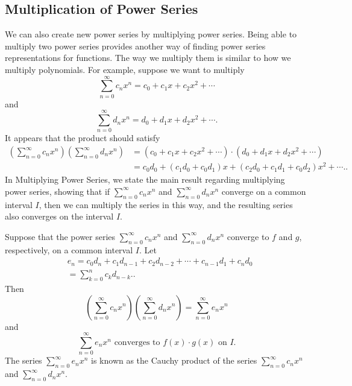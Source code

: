 \documentclass{report}
\begin{document}
    \subsection*{Multiplication of Power Series}
    \bigbreak \noindent 
    We can also create new power series by multiplying power series. Being able to multiply two power series provides another way of finding power series representations for functions.
    \bigbreak \noindent 
    The way we multiply them is similar to how we multiply polynomials. For example, suppose we want to multiply
    \[
    \sum_{n=0}^{\infty} c_n x^n = c_0 + c_1 x + c_2 x^2 + \cdots
    \]
    and
    \[
    \sum_{n=0}^{\infty} d_n x^n = d_0 + d_1 x + d_2 x^2 + \cdots.
    \]
    It appears that the product should satisfy
    \begin{align*}
        \left( \sum_{n=0}^{\infty} c_n x^n \right) \left( \sum_{n=0}^{\infty} d_n x^n \right) &= (c_0 + c_1 x + c_2 x^2 + \cdots) \cdot (d_0 + d_1 x + d_2 x^2 + \cdots)  \\
        &= c_0 d_0 + (c_1 d_0 + c_0 d_1) x + (c_2 d_0 + c_1 d_1 + c_0 d_2) x^2 + \cdots.
    .\end{align*}
    In Multiplying Power Series, we state the main result regarding multiplying power series, showing that if \(\sum_{n=0}^{\infty} c_n x^n\) and \(\sum_{n=0}^{\infty} d_n x^n\) converge on a common interval \(I\), then we can multiply the series in this way, and the resulting series also converges on the interval \(I\).
    \pagebreak \bigbreak \noindent 
    \begin{thrmm}
        Suppose that the power series \(\sum_{n=0}^{\infty} c_n x^n\) and \(\sum_{n=0}^{\infty} d_n x^n\) converge to \(f\) and \(g\), respectively, on a common interval \(I\). Let
        \begin{align*}
            &e_n = c_0 d_n + c_1 d_{n-1} + c_2 d_{n-2} + \cdots + c_{n-1} d_1 + c_n d_0  \\
            &= \sum_{k=0}^{n} c_k d_{n-k}.
        .\end{align*}
        Then
        \[
        \left( \sum_{n=0}^{\infty} c_n x^n \right) \left( \sum_{n=0}^{\infty} d_n x^n \right) = \sum_{n=0}^{\infty} e_n x^n
        \]
        and
        \[
        \sum_{n=0}^{\infty} e_n x^n \text{ converges to } f(x) \cdot g(x) \text{ on } I.
        \]
        The series \(\sum_{n=0}^{\infty} e_n x^n\) is known as the Cauchy product of the series \(\sum_{n=0}^{\infty} c_n x^n\) and \(\sum_{n=0}^{\infty} d_n x^n\).
    \end{thrmm}
\end{document}
